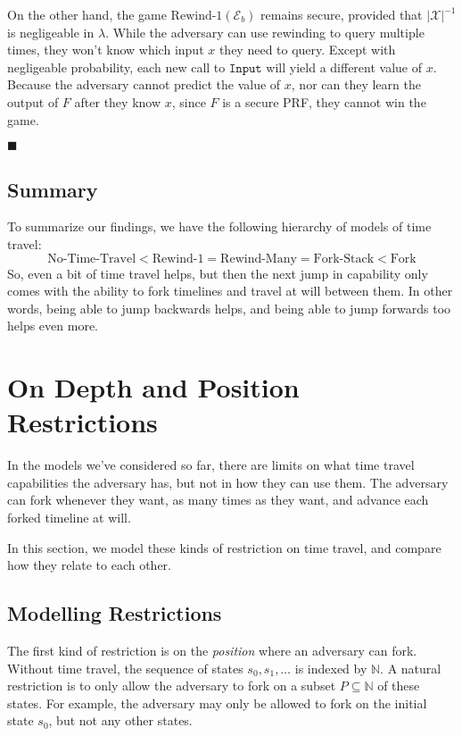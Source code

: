 On the other hand, the game $\text{Rewind-1}(\mathcal{E}_b)$ remains
secure, provided that $|\mathcal{X}|^{-1}$ is negligeable in $\lambda$.
While the adversary can use rewinding to query multiple times,
they won't know which input $x$ they need to query.
Except with negligeable probability, each new call to $\texttt{Input}$
will yield a different value of $x$.
Because the adversary cannot predict the value of $x$, nor can they
learn the output of $F$ after they know $x$, since $F$ is a secure
PRF, they cannot win the game.

$\blacksquare$

\subsection{Summary}

To summarize our findings, we have the following hierarchy of models
of time travel:
$$
\text{No-Time-Travel} < \text{Rewind-1} = \text{Rewind-Many} = \text{Fork-Stack} < \text{Fork}
$$
So, even a bit of time travel helps, but then the next jump in capability
only comes with the ability to fork timelines and travel at will between them.
In other words, being able to jump backwards helps, and being able to jump
forwards too helps even more.

\section{On Depth and Position Restrictions}

In the models we've considered so far, there are limits on what time travel capabilities
the adversary has, but not in how they can use them.
The adversary can fork whenever they want, as many times as they want,
and advance each forked timeline at will.

In this section, we model these kinds of restriction on time travel,
and compare how they relate to each other.

\subsection{Modelling Restrictions}

The first kind of restriction is on the \emph{position} where an
adversary can fork.
Without time travel, the sequence of states $s_0, s_1, \ldots$
is indexed by $\mathbb{N}$.
A natural restriction is to only allow the adversary to
fork on a subset $P \subseteq \mathbb{N}$ of these states.
For example, the adversary may only be allowed to fork on the initial
state $s_0$, but not any other states.

